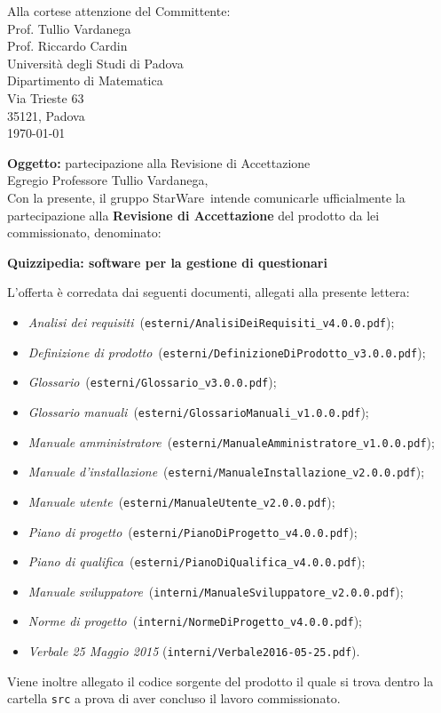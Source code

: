 \documentclass[12pt,a4paper]{article}
\title{\titoloDocumento}
\newcommand{\nomeGruppo}{StarWare}
\newcommand{\uni}{Universit\`{a} degli Studi di Padova}
\newcommand{\Cardin}{Prof. Riccardo Cardin}
\newcommand{\Vardanega}{Prof. Tullio Vardanega}
\newcommand{\prjL}{Quizzipedia: software per la gestione di questionari}
\newcommand{\NdP}{\emph{Norme di progetto}}
\newcommand{\AdR}{\emph{Analisi dei requisiti}}
\newcommand{\PdP}{\emph{Piano di progetto}}
\newcommand{\PdQ}{\emph{Piano di qualifica}}
\newcommand{\DP}{\emph{Definizione di prodotto}}
\newcommand{\MA}{\emph{Manuale amministratore}}
\newcommand{\MU}{\emph{Manuale utente}}
\newcommand{\MI}{\emph{Manuale d'installazione}}
\newcommand{\MS}{\emph{Manuale sviluppatore}}
\newcommand{\GL}{\emph{Glossario}}
\newcommand{\GM}{\emph{Glossario manuali}}
\newcommand{\NdPv}{\texttt{NormeDiProgetto\_v4.0.0.pdf}}
\newcommand{\AdRv}{\texttt{AnalisiDeiRequisiti\_v4.0.0.pdf}}
\newcommand{\PdPv}{\texttt{PianoDiProgetto\_v4.0.0.pdf}}
\newcommand{\PdQv}{\texttt{PianoDiQualifica\_v4.0.0.pdf}}
\newcommand{\DPv}{\texttt{DefinizioneDiProdotto\_v3.0.0.pdf}}
\newcommand{\MAv}{\texttt{ManualeAmministratore\_v1.0.0.pdf}}
\newcommand{\MUv}{\texttt{ManualeUtente\_v2.0.0.pdf}}
\newcommand{\MIv}{\texttt{ManualeInstallazione\_v2.0.0.pdf}}
\newcommand{\MSv}{\texttt{ManualeSviluppatore\_v2.0.0.pdf}}
\newcommand{\GLv}{\texttt{Glossario\_v3.0.0.pdf}}
\newcommand{\GMv}{\texttt{GlossarioManuali\_v1.0.0.pdf}}
\newcommand{\filePath}[1]{\texttt{#1}}
\begin{document}
\hspace{8cm}\begin{minipage}[t]{10cm}
	Alla cortese attenzione del Committente: \\
	\Vardanega \\
	\Cardin \\
	\uni \\
	Dipartimento di Matematica\\
	Via Trieste 63\\
	35121, Padova\\
	\today \\
\end{minipage}

\vspace{2cm}

\textbf{Oggetto:} partecipazione alla Revisione di Accettazione\\

Egregio Professore Tullio Vardanega,\\
Con la presente, il gruppo \nomeGruppo\ intende comunicarle ufficialmente la partecipazione alla \textbf{Revisione di Accettazione} del prodotto da lei commissionato, denominato:
\begin{center}
	\textbf{\prjL}
\end{center}
L’offerta è corredata dai seguenti documenti, allegati alla presente lettera:

\begin{itemize}
	\item \AdR\ (\filePath{esterni/}\AdRv);
	\item \DP\ (\filePath{esterni/}\DPv);
	\item \GL\ (\filePath{esterni/}\GLv);
	\item \GM\ (\filePath{esterni/}\GMv);
	\item \MA\ (\filePath{esterni/}\MAv);
	\item \MI\ (\filePath{esterni/}\MIv);
	\item \MU\ (\filePath{esterni/}\MUv);
	\item \PdP\ (\filePath{esterni/}\PdPv);
	\item \PdQ\ (\filePath{esterni/}\PdQv);
	\item \MS\ (\filePath{interni/}\MSv);
	\item \NdP\ (\filePath{interni/}\NdPv);
	\item \textit{Verbale 25 Maggio 2015} (\filePath{interni/Verbale2016-05-25.pdf}).
\end{itemize}

Viene inoltre allegato il codice sorgente del prodotto il quale si trova dentro la cartella \texttt{src} a prova di aver concluso il lavoro commissionato.
\end{document}
